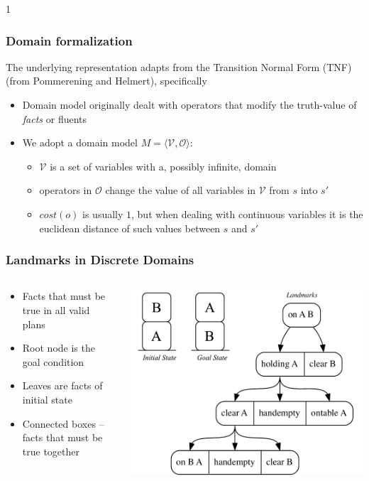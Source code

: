 \documentclass{beamer}
\def\masterclass{1}
\begin{document}
	\if\masterclass1
	\begin{frame}[c]\frametitle{Domain formalization}
		The underlying representation adapts from the Transition Normal Form (TNF) (from Pommerening and Helmert), specifically
		\begin{itemize}
			\item Domain model originally dealt with operators that modify the truth-value of \emph{facts} or fluents
			\item We adopt a domain model $M = \langle \mathcal{V}, \mathcal{O} \rangle$:
			\begin{itemize}
				\item $\mathcal{V}$ is a set of variables with a, possibly infinite, domain
				\item operators in $\mathcal{O}$ change the value of all variables in $\mathcal{V}$ from $s$ into $s'$
				\item $cost(o)$ is usually $1$, but when dealing with continuous variables it is the euclidean distance of such values between $s$ and $s'$
			\end{itemize}
		\end{itemize}
	\end{frame}
	
	\begin{frame}[c]\frametitle{Landmarks in Discrete Domains}
		\begin{columns}
			\begin{column}{0.5\textwidth}
				\begin{itemize}
					\item Facts that must be true in all valid plans
					\item Root node is the goal condition
					\item Leaves are facts of initial state
					\item Connected boxes – facts that must be true together
				\end{itemize}
			\end{column}
			\begin{column}{0.5\textwidth}
				\includegraphics[width=\textwidth]{fig/blocksworld-landmarks-example.pdf}
			\end{column}
		\end{columns}
	\end{frame}
	\fi
	
\end{document}
